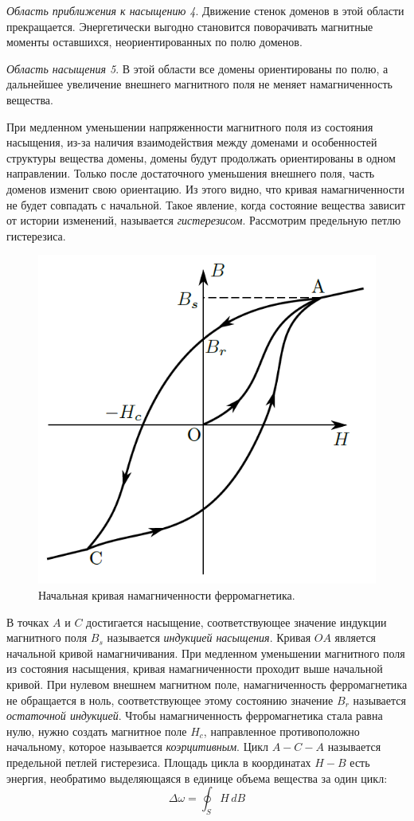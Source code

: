 \textit{Область приближения к насыщению 4}. Движение стенок доменов в этой области прекращается. Энергетически выгодно становится поворачивать магнитные моменты оставшихся, неориентированных по полю доменов.

\textit{Область насыщения 5}. В этой области все домены ориентированы по полю, а дальнейшее увеличение внешнего магнитного поля не меняет намагниченность вещества.

При медленном уменьшении напряженности магнитного поля из состояния насыщения, из-за наличия взаимодействия между доменами и особенностей структуры вещества домены, домены будут продолжать ориентированы в одном направлении. Только после достаточного уменьшения внешнего поля, часть доменов изменит свою ориентацию. Из этого видно, что кривая намагниченности не будет совпадать с начальной. Такое явление, когда состояние вещества зависит от истории изменений, называется \textit{гистерезисом}. Рассмотрим предельную петлю гистерезиса.

\begin{figure}
	\vspace{-10pt}
	\centering
	\includegraphics[width=0.90\linewidth]{../res/hysteresis.png}
	\caption{Начальная кривая намагниченности ферромагнетика.}
	\label{img:domen}
\end{figure}

В точках $A$ и $C$ достигается насыщение, соответствующее значение индукции магнитного поля $B_s$ называется \textit{индукцией насыщения}. Кривая $OA$ является начальной кривой намагничивания. При медленном уменьшении магнитного поля из состояния насыщения, кривая намагниченности проходит выше начальной кривой. При нулевом внешнем магнитном поле, намагниченность ферромагнетика не обращается в ноль, соответствующее этому состоянию значение $B_r$ называется \textit{остаточной индукцией}. Чтобы намагниченность ферромагнетика стала равна нулю, нужно создать магнитное поле $H_c$, направленное противоположно начальному, которое называется \textit{коэрцитивным}. Цикл $A-C-A$ называется предельной петлей гистерезиса. Площадь цикла в координатах $H-B$ есть энергия, необратимо выделяющаяся в единице объема вещества за один цикл:
$$
\Delta \omega = \oint_S H \,dB
$$


